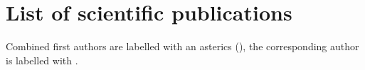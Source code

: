
\chapter{List of scientific publications}
\label{publications}


Combined first authors are labelled with an asterics (\Writinghand), the corresponding author is labelled with \Letter.


